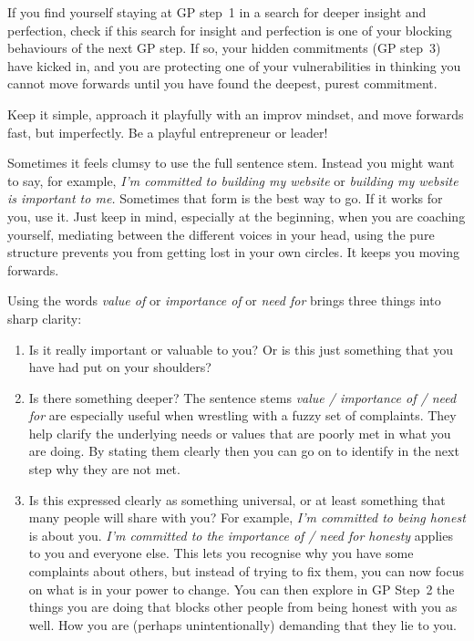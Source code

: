 If you find yourself staying at GP step~1 in a search for deeper insight and perfection, check if this search for insight and perfection is one of your blocking behaviours of the next GP step. If so, your hidden commitments (GP step~3) have kicked in, and you are protecting one of your vulnerabilities in thinking you cannot move forwards until you have found the deepest, purest commitment. 


Keep it simple, approach it playfully with an improv mindset, and move forwards fast, but imperfectly. Be a playful entrepreneur or leader\cite{dodgson-playful-entrepreneur}!


Sometimes it feels clumsy to use the full sentence stem. Instead you might want to say, for example, \emph{I'm committed to building my website} or \emph{building my website is important to me.} Sometimes that form is the best way to go. If it works for you, use it. Just keep in mind, especially at the beginning, when you are coaching yourself, mediating between the different voices in your head, using the pure structure prevents you from getting lost in your own circles. It keeps you moving forwards.


Using the words \emph{value of} or \emph{importance of} or \emph{need for} brings three things into sharp clarity:


\begin{enumerate}
\item Is it really important or valuable to you? Or is this just something that you have had put on your shoulders?
\item Is there something deeper? The sentence stems \emph{value / importance of / need for} are especially useful when wrestling with a fuzzy set of complaints. They help clarify the underlying needs or values that are poorly met in what you are doing. By stating them clearly then you can go on to identify in the next step why they are not met.
\item Is this expressed clearly as something universal, or at least something that many people will share with you? For example, \emph{I'm committed to being honest} is about you. \emph{I'm committed to the importance of / need for honesty} applies to you and everyone else. This lets you recognise why you have some complaints about others, but instead of trying to fix them, you can now focus on what is in your power to change. You can then explore in GP Step~2 the things you are doing that blocks other people from being honest with you as well. How you are (perhaps unintentionally) demanding that they lie to you.
\end{enumerate}


